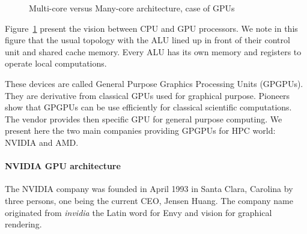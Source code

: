 \begin{figure}
\begin{center}
\hspace{1cm}
\end{center}
\caption{Multi-core versus Many-core architecture, case of GPUs}
\label{fig:2_HARD:gpu}
\end{figure}

Figure~\ref{fig:2_HARD:gpu} present the vision between CPU and GPU processors. 
We note in this figure that the usual topology with the ALU lined up in front of their control unit and shared cache memory. 
Every ALU has its own memory and registers to operate local computations. 

These devices are called General Purpose Graphics Processing Units (GPGPUs). 
They are derivative from classical GPUs used for graphical purpose.
Pioneers show that GPGPUs can be use efficiently for classical scientific computations.
The vendor provides then specific GPU for general purpose computing.  
We present here the two main companies providing GPGPUs for HPC world: NVIDIA and AMD.

\paragraph{NVIDIA GPU architecture}
The NVIDIA company was founded in April 1993 in Santa Clara, Carolina by three persons, one being the current CEO, Jensen Huang.
The company name originated from \textit{invidia} the Latin word for Envy and vision for graphical rendering. 


